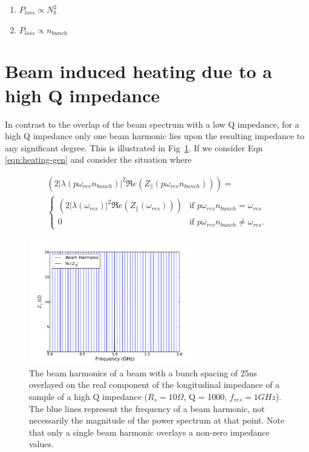 \documentclass{cernrep}
\begin{document}
\begin{enumerate}
\item{$P_{loss} \propto N_{b}^{2}$}
\item{$P_{loss} \propto n_{bunch}$}
\end{enumerate}

\section{Beam induced heating due to a high Q impedance}

In contrast to the overlap of the beam spectrum with a low Q impedance, for a high Q impedance only one beam harmonic lies upon the resulting impedance to any significant degree. This is illustrated in Fig~\ref{fig:high_q_harmonics}. If we consider Eqn \ref{eqn:heating-gen} and consider the situation where

\begin{align}
\left( 2 \left| \lambda \left(p \omega_{rev}n_{bunch} \right)  \right|^{2}  \Re{}e \left( Z_{\parallel} \left(p \omega_{rev}n_{bunch}\right) \right) \right) = \nonumber \\
\begin{cases}
\left( 2 \left| \lambda \left( \omega_{res} \right)  \right|^{2}  \Re{}e \left( Z_{\parallel} \left( \omega_{res} \right) \right) \right) &\textrm{if $p \omega_{rev} n_{bunch} = \omega_{res}$}\\
0								&\textrm{if $p \omega_{rev} n_{bunch} \neq \omega_{res}$}.
\end{cases}
\label{eqn:single_harmonic_profile}
\end{align}

\begin{figure}
\begin{center}
\includegraphics[width=0.65\textwidth]{figures/high_q_1000_resonance_beam_harmonics.pdf}
\end{center}
\caption{The beam harmonics of a beam with a bunch spacing of 25ns overlayed on the real component of the longitudinal impedance of a sample of a high Q impedance ($R_{s}=10\Omega$, Q = 1000, $f_{res}=1GHz$). The blue lines represent the frequency of a beam harmonic, not necessarily the magnitude of the power spectrum at that point. Note that only a single beam harmonic overlays a non-zero impedance values.}
\label{fig:high_q_harmonics}
\end{figure}
\end{document}
